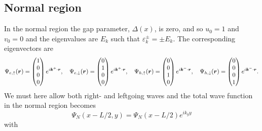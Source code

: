 \subsection{Normal region}
In the normal region the gap parameter, $\Delta(x)$, is zero, and so $u_0 = 1$ and $v_0 = 0$ and the eigenvalues are $E_{k}$ such that $\varepsilon^{\pm}_{k}= \pm E_k$. The corresponding eigenvectors are
\begin{equation}
\begin{split}
    \Psi_{e,\uparrow}(\boldsymbol{r}) = 
    \begin{pmatrix}
        1 \\ 0 \\ 0 \\ 0
    \end{pmatrix}e^{i\boldsymbol{k}^+\cdot \boldsymbol{r}},
    \quad
    \Psi_{e,\downarrow}(\boldsymbol{r}) = 
    \begin{pmatrix}
        0 \\ 1 \\ 0 \\0
    \end{pmatrix}e^{i\boldsymbol{k}^+\cdot\boldsymbol{r}},
    \quad
    \Psi_{h,\uparrow}(\boldsymbol{r}) = 
    \begin{pmatrix}
        0 \\ 0 \\ 1 \\0
    \end{pmatrix}e^{i\boldsymbol{k}^-\cdot\boldsymbol{r}},
    \quad
    \Psi_{h,\downarrow}(\boldsymbol{r}) = 
    \begin{pmatrix}
        0 \\ 0 \\ 0 \\ 1
    \end{pmatrix}e^{i\boldsymbol{k}^-\cdot\boldsymbol{r}}.
\end{split}
\end{equation}
We must here allow both right- and leftgoing waves and the total wave function in the normal region becomes
\begin{equation}
\Psi_N(x-L/2,y) = \Psi_N(x-L/2)e^{ik_yy}
\end{equation}
with
